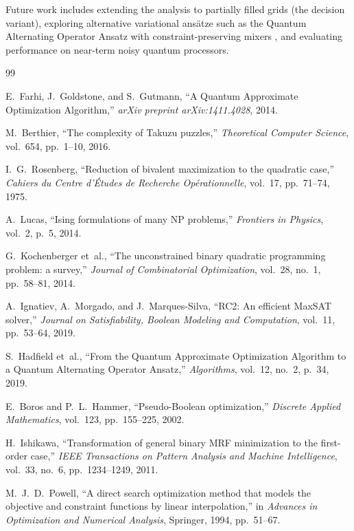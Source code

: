 \documentclass[eng]{ajceam-class}
\begin{document}
Future work includes extending the analysis to partially filled grids (the decision variant), exploring alternative variational ansätze such as the Quantum Alternating Operator Ansatz with constraint-preserving mixers \cite{hadfield2019qaoa}, and evaluating performance on near-term noisy quantum processors.


\begin{thebibliography}{99}

E.~Farhi, J.~Goldstone, and S.~Gutmann, ``A Quantum Approximate Optimization Algorithm,'' \textit{arXiv preprint arXiv:1411.4028}, 2014.

M.~Berthier, ``The complexity of Takuzu puzzles,'' \textit{Theoretical Computer Science}, vol.~654, pp.~1--10, 2016.

I.~G.~Rosenberg, ``Reduction of bivalent maximization to the quadratic case,'' \textit{Cahiers du Centre d'Études de Recherche Opérationnelle}, vol.~17, pp.~71--74, 1975.

A.~Lucas, ``Ising formulations of many NP problems,'' \textit{Frontiers in Physics}, vol.~2, p.~5, 2014.

G.~Kochenberger et~al., ``The unconstrained binary quadratic programming problem: a survey,'' \textit{Journal of Combinatorial Optimization}, vol.~28, no.~1, pp.~58--81, 2014.

A.~Ignatiev, A.~Morgado, and J.~Marques-Silva, ``RC2: An efficient MaxSAT solver,'' \textit{Journal on Satisfiability, Boolean Modeling and Computation}, vol.~11, pp.~53--64, 2019.

S.~Hadfield et~al., ``From the Quantum Approximate Optimization Algorithm to a Quantum Alternating Operator Ansatz,'' \textit{Algorithms}, vol.~12, no.~2, p.~34, 2019.

E.~Boros and P.~L.~Hammer, ``Pseudo-Boolean optimization,'' \textit{Discrete Applied Mathematics}, vol.~123, pp.~155--225, 2002.

H.~Ishikawa, ``Transformation of general binary MRF minimization to the first-order case,'' \textit{IEEE Transactions on Pattern Analysis and Machine Intelligence}, vol.~33, no.~6, pp.~1234--1249, 2011.

M.~J.~D.~Powell, ``A direct search optimization method that models the objective and constraint functions by linear interpolation,'' in \textit{Advances in Optimization and Numerical Analysis}, Springer, 1994, pp.~51--67.


\end{thebibliography}
\end{document}
